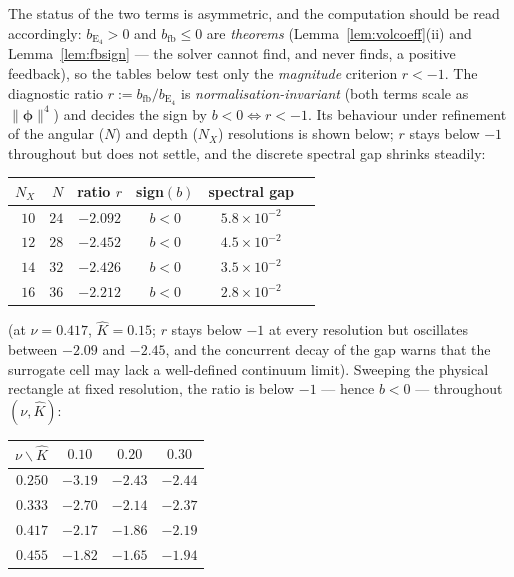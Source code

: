 The status of the two terms is asymmetric, and the computation should be read accordingly: $b_{\mathrm{E_4}}>0$ and
$b_{\mathrm{fb}}\le0$ are \emph{theorems} (Lemma~\ref{lem:volcoeff}(ii) and Lemma~\ref{lem:fbsign} --- the solver
cannot find, and never finds, a positive feedback), so the tables below test only the \emph{magnitude} criterion
$r<-1$. The diagnostic ratio $r:=b_{\mathrm{fb}}/b_{\mathrm{E_4}}$ is \emph{normalisation-invariant} (both terms scale
as $\|\bm\phi\|^4$) and decides the sign by $b<0\iff r<-1$. Its behaviour under refinement of the angular ($N$) and
depth ($N_X$) resolutions is shown below; $r$ stays below $-1$ throughout but does not settle, and the discrete
spectral gap shrinks steadily:
\begin{center}
    \begin{tabular}{rrcccc}
        \toprule
        $N_X$ & $N$ & ratio $r$ & sign$(b)$ & spectral gap \\
        \midrule
        $10$ & $24$ & $-2.092$ & $b<0$ & $5.8\times10^{-2}$ \\
        $12$ & $28$ & $-2.452$ & $b<0$ & $4.5\times10^{-2}$ \\
        $14$ & $32$ & $-2.426$ & $b<0$ & $3.5\times10^{-2}$ \\
        $16$ & $36$ & $-2.212$ & $b<0$ & $2.8\times10^{-2}$ \\
        \bottomrule
    \end{tabular}
\end{center}
(at $\nu=0.417$, $\hat K=0.15$; $r$ stays below $-1$ at every resolution but oscillates between $-2.09$ and $-2.45$,
and the concurrent decay of the gap warns that the surrogate cell may lack a well-defined continuum limit). Sweeping
the physical rectangle at fixed resolution, the ratio is below $-1$ --- hence $b<0$ --- throughout $(\nu,\hat K)$:
\begin{center}
    \begin{tabular}{rccc}
        \toprule
        $\nu\backslash\hat K$ & $0.10$ & $0.20$ & $0.30$ \\
        \midrule
        $0.250$ & $-3.19$ & $-2.43$ & $-2.44$ \\
        $0.333$ & $-2.70$ & $-2.14$ & $-2.37$ \\
        $0.417$ & $-2.17$ & $-1.86$ & $-2.19$ \\
        $0.455$ & $-1.82$ & $-1.65$ & $-1.94$ \\
        \bottomrule
    \end{tabular}
\end{center}
